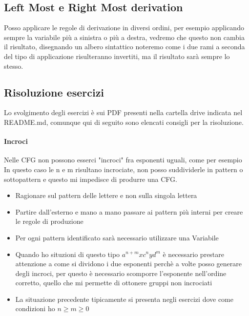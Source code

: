 \documentclass[12pt, a4paper, openany]{book}
\begin{document}
\subsection*{Left Most e Right Most derivation}
Posso applicare le regole di derivazione in diversi ordini, per esempio applicando sempre la variabile più
a sinistra o più a destra, vedremo che questo non cambia il risultato, disegnando un albero sintattico noteremo
come i due rami a seconda del tipo di applicazione risulteranno invertiti, ma il risultato sarà sempre lo stesso.
\subsection*{Risoluzione esercizi}
Lo svolgimento degli esercizi è sui PDF presenti nella cartella drive indicata nel README.md, comunque
qui di seguito sono elencati consigli per la risoluzione.
\paragraph*{Incroci} Nelle CFG non possono esserci "incroci" fra esponenti uguali, come per esempio
 In questo caso le n e m risultano incrociate, non posso suddividerle in pattern o
sottopattern e questo mi impedisce di produrre una CFG.
\begin{itemize}
    \item Ragionare sul pattern delle lettere e non sulla singola lettera
    \item Partire dall'esterno e mano a mano passare ai pattern più interni per creare le regole di produzione
    \item Per ogni pattern identificato sarà necessario utilizzare una Variabile
    \item Quando ho situzioni di questo tipo $a^{n+m}xc^n y d^m$ è necessario prestare attenzione a
    come si dividono i due esponenti perchè a volte posso generare degli incroci, per questo è necessario
    scomporre l'esponente nell'ordine corretto, quello che mi permette di ottonere gruppi non incrociati
    \item La situazione precedente tipicamente si presenta negli esercizi dove come condizioni ho $n \geq m \geq 0$
\end{itemize}
\end{document}
